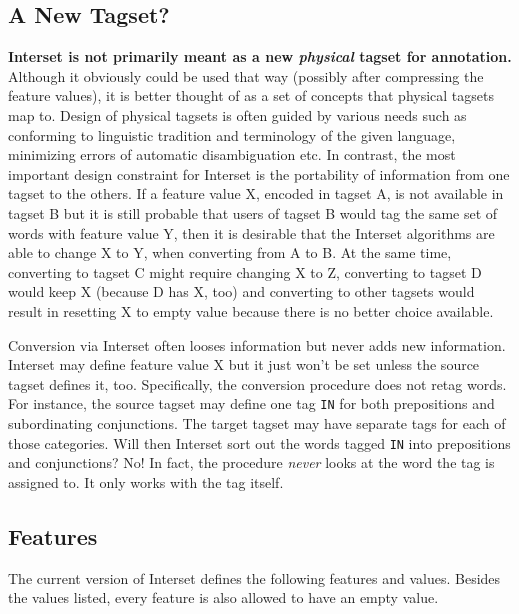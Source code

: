 \documentclass[11pt]{article}
\begin{document}
\subsection{A New Tagset?}
\label{sec:notatagset}

\textbf{Interset is not primarily meant as a new \textit{physical} tagset for annotation.} Although it obviously could be used that way (possibly after compressing the feature values), it is better thought of as a set of concepts that physical tagsets map to. Design of physical tagsets is often guided by various needs such as conforming to linguistic tradition and terminology of the given language, minimizing errors of automatic disambiguation etc. In contrast, the most important design constraint for Interset is the portability of information from one tagset to the others. If a feature value X, encoded in tagset A, is not available in tagset B but it is still probable that users of tagset B would tag the same set of words with feature value Y, then it is desirable that the Interset algorithms are able to change X to Y, when converting from A to B. At the same time, converting to tagset C might require changing X to Z, converting to tagset D would keep X (because D has X, too) and converting to other tagsets would result in resetting X to empty value because there is no better choice available.

Conversion via Interset often looses information but never adds new information. Interset may define feature value X but it just won't be set unless the source tagset defines it, too. Specifically, the conversion procedure does not retag words. For instance, the source tagset may define one tag \texttt{IN} for both prepositions and subordinating conjunctions. The target tagset may have separate tags for each of those categories. Will then Interset sort out the words tagged \texttt{IN} into prepositions and conjunctions? No! In fact, the procedure \textit{never} looks at the word the tag is assigned to. It only works with the tag itself.

\subsection{Features}
\label{sec:features}

The current version of Interset defines the following features and values. Besides the values listed, every feature is also allowed to have an empty value.
\end{document}
